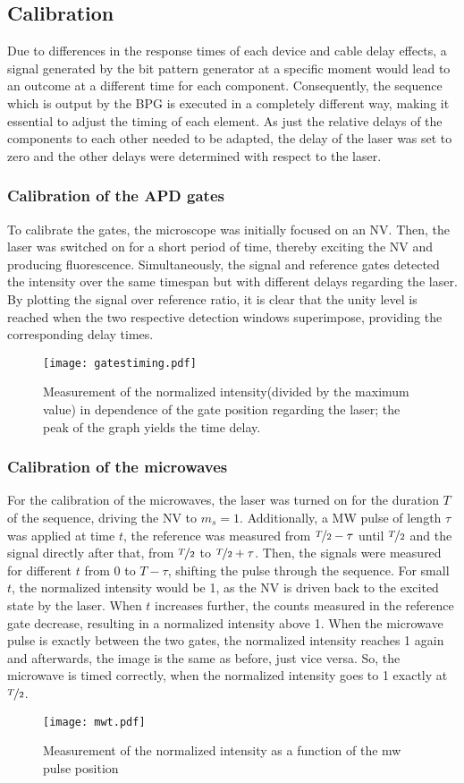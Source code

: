 \documentclass[12pt,a4paper]{article}
\begin{document}
\subsection{Calibration}
Due to differences in the response times of each device and cable delay effects, a signal generated by the bit pattern generator at a specific moment would lead to an outcome at a different time for each component. Consequently, the sequence which is output by the BPG is executed in a completely different way, making it essential to adjust the timing of each element. As just the relative delays of the components to each other needed to be adapted, the delay of the laser was set to zero and the other delays were determined with respect to the laser.
\subsubsection{Calibration of the APD gates}
To calibrate the gates, the microscope was initially focused on an NV. Then, the laser was switched on for a short period of time, thereby exciting the NV and producing fluorescence. Simultaneously, the signal and reference gates detected the intensity over the same timespan but with different delays regarding the laser. By plotting the signal over reference ratio, it is clear that the unity level is reached  when the two respective detection windows superimpose, providing the corresponding delay times.
\begin{figure}[H]
\centering
\texttt{[image: gatestiming.pdf]} 
\caption{Measurement of the normalized intensity(divided by the maximum value) in dependence of the gate position regarding the laser; the peak of the graph yields the time delay.}
\label{gt}
\end{figure}
\subsubsection{Calibration of the microwaves}
For the calibration of the microwaves, the laser was turned on for the duration $T$ of the sequence, driving the NV to $m_s=1$. Additionally, a MW pulse of length $\tau$ was applied at time $t$, the reference was measured from $\nicefrac{T}{2}-\tau$ until $\nicefrac{T}{2}$ and the signal directly after that, from $\nicefrac{T}{2}$ to $\nicefrac{T}{2}+\tau$. Then, the signals were measured for different $t$ from 0 to $T-\tau$, shifting the pulse through the sequence. For small $t$, the normalized intensity would be 1, as the NV is driven back to the excited state by the laser. When $t$ increases further, the counts measured in the reference gate decrease, resulting in a normalized intensity above 1. When the microwave pulse is exactly between the two gates, the normalized intensity reaches 1 again and afterwards, the image is the same as before, just vice versa. So, the microwave is timed correctly, when the normalized intensity goes to 1 exactly at $\nicefrac{T}{2}$.
\begin{figure}[H]
\centering
\texttt{[image: mwt.pdf]} 
\caption{Measurement of the normalized intensity as a function of the mw pulse position}
\label{mwt}
\end{figure}
\end{document}
